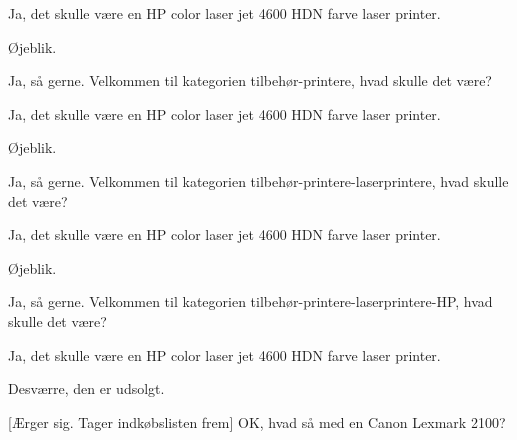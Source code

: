 \documentclass[a4paper,11pt]{article}
\begin{document}
\begin{sketch}
 Ja, det skulle være en HP color laser jet 4600 HDN farve laser printer.

 Øjeblik.


 Ja, så gerne. Velkommen til kategorien tilbehør-printere, hvad skulle det være?

 Ja, det skulle være en HP color laser jet 4600 HDN farve laser printer.

 Øjeblik.


 Ja, så gerne. Velkommen til kategorien tilbehør-printere-laserprintere, hvad skulle det være?

 Ja, det skulle være en HP color laser jet 4600 HDN farve laser printer.

 Øjeblik.


 Ja, så gerne. Velkommen til kategorien tilbehør-printere-laserprintere-HP, hvad skulle det være?

 Ja, det skulle være en HP color laser jet 4600 HDN farve laser printer.

 Desværre, den er udsolgt. 

[Ærger sig. Tager indkøbslisten frem] OK, hvad så med en Canon Lexmark 2100?

\end{sketch}
\end{document}
